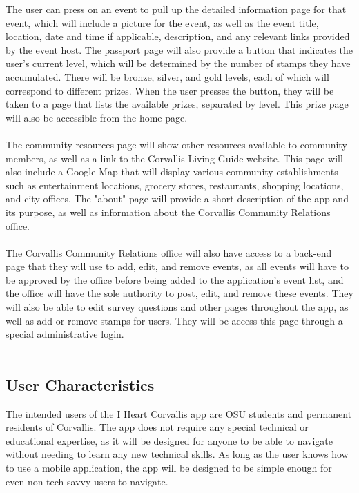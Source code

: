 \documentclass[draftclsnofoot, onecolumn, 10pt, compsoc]{IEEEtran}
\begin{document}
			The user can press on an event to pull up the detailed information page for that event, which will include a picture for the event, as well as the event title, location, date and time if applicable, description, and any relevant links provided by the event host. The passport page will also provide a button that indicates the user's current level, which will be determined by the number of stamps they have accumulated. There will be bronze, silver, and gold levels, each of which will correspond to different prizes. When the user presses the button, they will be taken to a page that lists the available prizes, separated by level. This prize page will also be accessible from the home page. \\ \\
			The community resources page will show other resources available to community members, as well as a link to the Corvallis Living Guide website. This page will also include a Google Map that will display various community establishments such as entertainment locations, grocery stores, restaurants, shopping locations, and city offices. The "about" page will provide a short description of the app and its purpose, as well as information about the Corvallis Community Relations office. \\ \\
			The Corvallis Community Relations office will also have access to a back-end page that they will use to add, edit, and remove events, as all events will have to be approved by the office before being added to the application's event list, and the office will have the sole authority to post, edit, and remove these events. They will also be able to edit survey questions and other pages throughout the app, as well as add or remove stamps for users. They will be access this page through a special administrative login. \\ \\
		
		\subsection{User Characteristics}
			The intended users of the I Heart Corvallis app are OSU students and permanent residents of Corvallis. The app does not require any special technical or educational expertise, as it will be designed for anyone to be able to navigate without needing to learn any new technical skills. As long as the user knows how to use a mobile application, the app will be designed to be simple enough for even non-tech savvy users to navigate.
		
\end{document}
